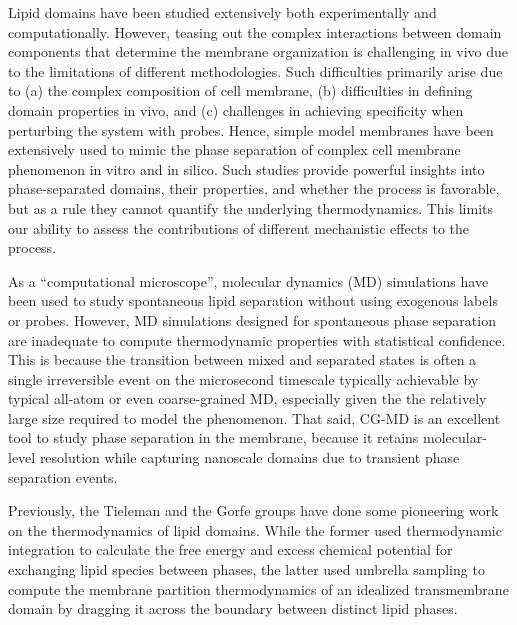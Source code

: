 \documentclass{biophys-new}
\begin{document}
Lipid domains have been studied extensively both experimentally and computationally.
However, teasing out the complex interactions between domain components that determine the membrane organization is challenging in vivo due to the limitations of different methodologies\cite{Klotzsch2013}.
Such difficulties primarily arise due to (a) the complex composition of cell membrane\cite{Tieleman2019}, (b) difficulties in defining domain properties in vivo\cite{Sezgin2017}, and (c) challenges in achieving specificity when perturbing the system with probes\cite{Veatch2007}.
Hence, simple model membranes have been extensively used to mimic the phase separation of complex cell membrane phenomenon in vitro\cite{Veatch2003a,Veatch2002,Veatch2003} and in silico\cite{Risselada2008,Lin2016,Lin2019}.
Such studies provide powerful insights into phase-separated domains, their properties, and whether the process is favorable, but as a rule they cannot quantify the underlying thermodynamics. This limits our ability to assess the contributions of different mechanistic effects to the process.

As a ``computational microscope\cite{Dror2012}'', molecular dynamics (MD) simulations have been used to study spontaneous lipid separation without using exogenous labels or probes\cite{Pantelopulos2018}.
However, MD simulations designed for spontaneous phase separation are inadequate to compute thermodynamic properties with statistical confidence.
This is because the transition between mixed and separated states is often a single irreversible event on the microsecond timescale typically achievable by typical all-atom or even coarse-grained MD\cite{Risselada2008,Bennett2018}, especially given the
the relatively large size required to model the phenomenon. 
That said, CG-MD is an excellent tool to study phase separation in the membrane, because it retains molecular-level resolution while capturing nanoscale domains due to transient phase separation events.

Previously, the Tieleman\cite{Bennett2018} and the Gorfe groups\cite{Lin2019} have done some pioneering work on the thermodynamics of lipid domains.
While the former used thermodynamic integration\cite{Salsburg1953} to calculate the free energy and excess chemical potential for exchanging lipid species between phases, the latter used umbrella sampling\cite{TorrieG.MValleau1977} to compute the membrane partition thermodynamics of an idealized transmembrane domain by dragging it across the boundary between distinct lipid phases.
\end{document}
